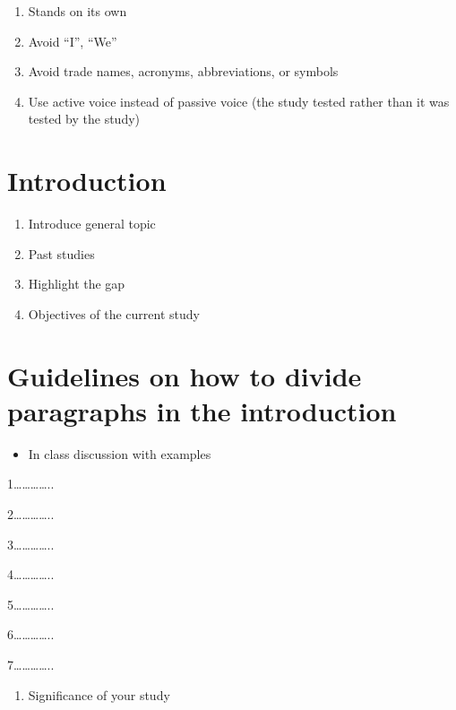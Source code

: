 \documentclass[
  letterpaper,
  DIV=11,
  numbers=noendperiod]{scrreprt}
\providecommand{\tightlist}{%
  \setlength{\itemsep}{0pt}\setlength{\parskip}{0pt}}\usepackage{longtable,booktabs,array}
\begin{document}
\begin{enumerate}
\def\labelenumi{\arabic{enumi}.}
\item
  Stands on its own
\item
  Avoid ``I'', ``We''
\item
  Avoid trade names, acronyms, abbreviations, or symbols
\item
  Use active voice instead of passive voice (the study tested rather
  than it was tested by the study)
\end{enumerate}


\chapter{Introduction}\label{introduction}

\begin{enumerate}
\def\labelenumi{\arabic{enumi}.}
\item
  Introduce general topic
\item
  Past studies
\item
  Highlight the gap
\item
  Objectives of the current study
\end{enumerate}


\chapter{Guidelines on how to divide paragraphs in the
introduction}\label{guidelines-on-how-to-divide-paragraphs-in-the-introduction}

\begin{itemize}
\tightlist
\item
  In class discussion with examples
\end{itemize}

1\ldots\ldots\ldots\ldots..

2\ldots\ldots\ldots\ldots..

3\ldots\ldots\ldots\ldots..

4\ldots\ldots\ldots\ldots..

5\ldots\ldots\ldots\ldots..

6\ldots\ldots\ldots\ldots..

7\ldots\ldots\ldots\ldots..

\begin{enumerate}
\def\labelenumi{\arabic{enumi}.}
\setcounter{enumi}{7}
\tightlist
\item
  Significance of your study
\end{enumerate}
\end{document}

